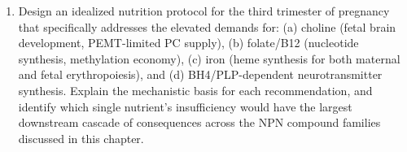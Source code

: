 \documentclass{tufte-handout}
\begin{document}
\begin{enumerate}
\item Design an idealized nutrition protocol for the third trimester of pregnancy that specifically addresses the elevated demands for: (a) choline (fetal brain development, PEMT-limited PC supply), (b) folate/B12 (nucleotide synthesis, methylation economy), (c) iron (heme synthesis for both maternal and fetal erythropoiesis), and (d) BH4/PLP-dependent neurotransmitter synthesis. Explain the mechanistic basis for each recommendation, and identify which single nutrient's insufficiency would have the largest downstream cascade of consequences across the NPN compound families discussed in this chapter.
\end{enumerate}




\end{document}

